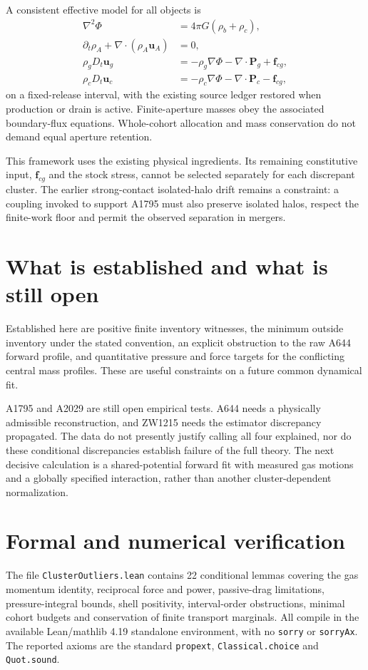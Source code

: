 \documentclass[11pt]{article}
\begin{document}
A consistent effective model for all objects is
\begin{align}
\nabla^2\Phi &=4\pi G(\rho_b+\rho_c),\\
\partial_t\rho_A+\nabla\cdot(\rho_A\mathbf u_A)&=0,\\
\rho_g D_t\mathbf u_g&=-\rho_g\nabla\Phi-\nabla\cdot\mathbf P_g+\mathbf f_{cg},\\
\rho_c D_t\mathbf u_c&=-\rho_c\nabla\Phi-\nabla\cdot\mathbf P_c-\mathbf f_{cg},
\end{align}
on a fixed-release interval, with the existing source ledger restored when production or drain is active. Finite-aperture masses obey the associated boundary-flux equations. Whole-cohort allocation and mass conservation do not demand equal aperture retention.

This framework uses the existing physical ingredients. Its remaining constitutive input, $\mathbf f_{cg}$ and the stock stress, cannot be selected separately for each discrepant cluster. The earlier strong-contact isolated-halo drift remains a constraint: a coupling invoked to support A1795 must also preserve isolated halos, respect the finite-work floor and permit the observed separation in mergers.

\section{What is established and what is still open}
Established here are positive finite inventory witnesses, the minimum outside inventory under the stated convention, an explicit obstruction to the raw A644 forward profile, and quantitative pressure and force targets for the conflicting central mass profiles. These are useful constraints on a future common dynamical fit.

A1795 and A2029 are still open empirical tests. A644 needs a physically admissible reconstruction, and ZW1215 needs the estimator discrepancy propagated. The data do not presently justify calling all four explained, nor do these conditional discrepancies establish failure of the full theory. The next decisive calculation is a shared-potential forward fit with measured gas motions and a globally specified interaction, rather than another cluster-dependent normalization.

\clearpage
\section{Formal and numerical verification}
The file \texttt{ClusterOutliers.lean} contains 22 conditional lemmas covering the gas momentum identity, reciprocal force and power, passive-drag limitations, pressure-integral bounds, shell positivity, interval-order obstructions, minimal cohort budgets and conservation of finite transport marginals. All compile in the available Lean/mathlib 4.19 standalone environment, with no \texttt{sorry} or \texttt{sorryAx}. The reported axioms are the standard \texttt{propext}, \texttt{Classical.choice} and \texttt{Quot.sound}.
\end{document}
